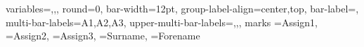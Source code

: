 \documentclass[12pt]{article}
\begin{document}
\DTLmultibarchart
{
 variables={\assignI,\assignII,\assignIII},
 round=0,
 bar-width=12pt,
 group-label-align={center,top},
 bar-label={\xDTLinitials{\Forename}\xDTLinitials{\Surname}},
 multi-bar-labels={A1,A2,A3},
 upper-multi-bar-labels={\DTLbarvalue,\DTLbarvalue,\DTLbarvalue},
}
{marks}%
{
 \assignI=Assign1,
 \assignII=Assign2,
 \assignIII=Assign3,
 \Surname=Surname,
 \Forename=Forename
} 
\end{document}
